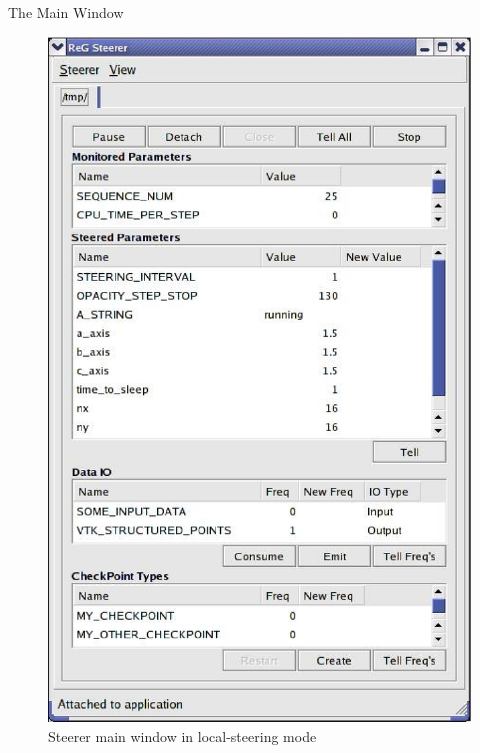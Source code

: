 \documentclass[a4paper,twoside]{article}
\begin{document}
\begin{section}{The Main Window}

\begin{figure}
\centerline{\includegraphics{main_local.eps}}
\caption{Steerer main window in local-steering mode}
\label{fig:main_local}
\end{figure}


\end{section}
\end{document}
